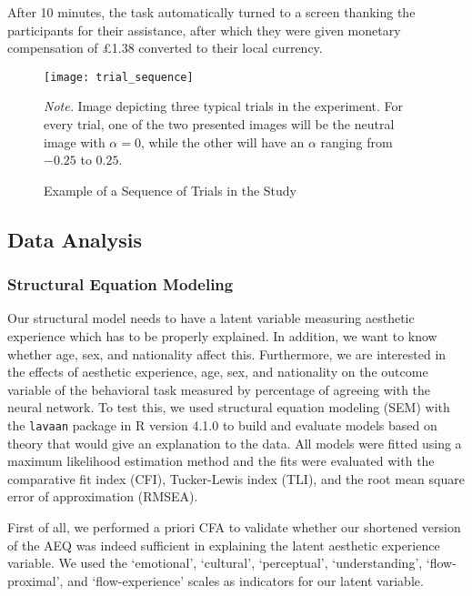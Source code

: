 \documentclass[../main.tex]{subfiles}
\begin{document}
After 10 minutes, the task automatically turned to a screen thanking the participants for their assistance, after which they were given monetary compensation of £1.38 converted to their local currency.
	

\begin{figure}
	\begin{center}
	\caption{Example of a Sequence of Trials in the Study}
	\label{fig:trial_sequence}
	\texttt{[image: trial\_sequence]}
	\end{center}
	\vfill
	{\normalfont \textit{Note.} Image depicting three typical trials in the experiment. For every trial, one of the two presented images will be the neutral image with $\alpha=0$, while the other will have an $\alpha$ ranging from $-0.25$ to $0.25$.}
\end{figure}

	
\subsection{Data Analysis}
	\subsubsection{Structural Equation Modeling}
	Our structural model needs to have a latent variable measuring aesthetic experience which has to be properly explained. In addition, we want to know whether age, sex, and nationality affect this. Furthermore, we are interested in the effects of aesthetic experience, age, sex, and nationality on the outcome variable of the behavioral task measured by percentage of agreeing with the neural network. To test this, we used structural equation modeling (SEM) with the \texttt{lavaan} package \parencite{rosseel2012lavaan} in R version 4.1.0 \parencite{rcoreteamlanguage} to build and evaluate models based on theory that would give an explanation to the data. All models were fitted using a maximum likelihood estimation method and the fits were evaluated with the comparative fit index (CFI), Tucker-Lewis index (TLI), and the root mean square error of approximation (RMSEA).
	
	First of all, we performed a priori CFA to validate whether our shortened version of the AEQ was indeed sufficient in explaining the latent aesthetic experience variable. We used the `emotional', `cultural', `perceptual', `understanding', `flow-proximal', and `flow-experience' scales as indicators for our latent variable. 
	
\end{document}

